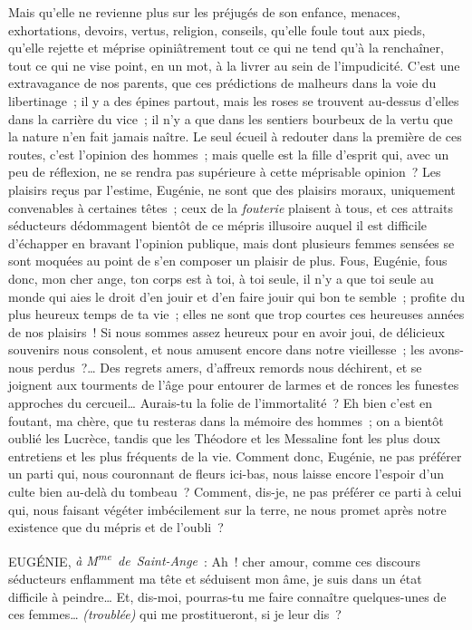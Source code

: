 \documentclass[french,twoside]{book} %
\begin{document}
Mais qu’elle ne revienne plus sur les préjugés de son enfance, menaces, exhortations, devoirs, vertus, religion, conseils, qu’elle foule tout aux pieds, qu’elle rejette et méprise opiniâtrement tout ce qui ne tend qu’à la renchaîner, tout ce qui ne vise point, en un mot, à la livrer au sein de l’impudicité. C’est une extravagance de nos parents, que ces prédictions de malheurs dans la voie du libertinage ; il y a des épines partout, mais les roses se trouvent au-dessus d’elles dans la carrière du vice ; il n’y a que dans les sentiers bourbeux de la vertu que la nature n’en fait jamais naître. Le seul écueil à redouter dans la première de ces routes, c’est l’opinion des hommes ; mais quelle est la fille d’esprit qui, avec un peu de réflexion, ne se rendra pas supérieure à cette méprisable opinion ? Les plaisirs reçus par l’estime, Eugénie, ne sont que des plaisirs moraux, uniquement convenables à certaines têtes ; ceux de la {\itshape fouterie} plaisent à tous, et ces attraits séducteurs dédommagent bientôt de ce mépris illusoire auquel il est difficile d’échapper en bravant l’opinion publique, mais dont plusieurs femmes sensées se sont moquées au point de s’en composer un plaisir de plus. Fous, Eugénie, fous donc, mon cher ange, ton corps est à toi, à toi seule, il n’y a que toi seule au monde qui aies le droit d’en jouir et d’en faire jouir qui bon te semble ; profite du plus heureux temps de ta vie ; elles ne sont que trop courtes ces heureuses années de nos plaisirs ! Si nous sommes assez heureux pour en avoir joui, de délicieux souvenirs nous consolent, et nous amusent encore dans notre vieillesse ; les avons-nous perdus ?… Des regrets amers, d’affreux remords nous déchirent, et se joignent aux tourments de l’âge pour entourer de larmes et de ronces les funestes approches du cercueil… Aurais-tu la folie de l’immortalité ? Eh bien c’est en foutant, ma chère, que tu resteras dans la mémoire des hommes ; on a bientôt oublié les Lucrèce, tandis que les Théodore et les Messaline font les plus doux entretiens et les plus fréquents de la vie. Comment donc, Eugénie, ne pas préférer un parti qui, nous couronnant de fleurs ici-bas, nous laisse encore l’espoir d’un culte bien au-delà du tombeau ? Comment, dis-je, ne pas préférer ce parti à celui qui, nous faisant végéter imbécilement sur la terre, ne nous promet après notre existence que du mépris et de l’oubli ?\par
EUGÉNIE, {\itshape à M\textsuperscript{me} de Saint-Ange} : Ah ! cher amour, comme ces discours séducteurs enflamment ma tête et séduisent mon âme, je suis dans un état difficile à peindre… Et, dis-moi, pourras-tu me faire connaître quelques-unes de ces femmes… {\itshape (troublée)} qui me prostitueront, si je leur dis ?\par
\end{document}
